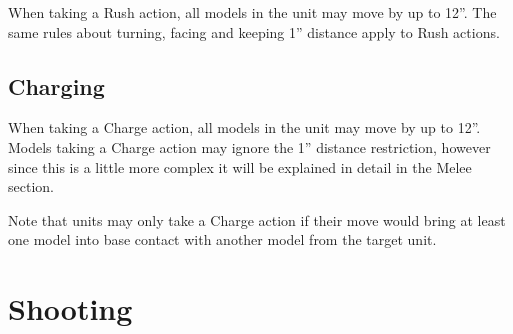 \documentclass[9pt, a4paper]{extarticle}            %
\begin{document}
\begin{multicols}{2}
When taking a Rush action, all models in the unit may move by up to 12”. The same rules about turning, facing and keeping 1” distance apply to Rush actions.

\subsection{Charging}

When taking a Charge action, all models in the unit may move by up to 12”. Models taking a Charge action may ignore the 1” distance restriction, however since this is a little more complex it will be explained in detail in the Melee section.

Note that units may only take a Charge action if their move would bring at least one model into base contact with another model from the target unit.

\end{multicols}


\newpage



\section{Shooting}
\end{document}
